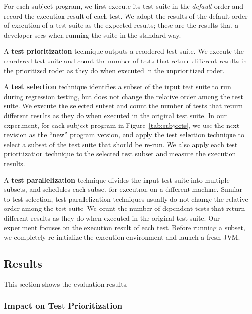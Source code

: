 For each subject program, we first execute its
test suite in the \textit{default} order and record
the execution result of each test.
We adopt the results of the default
order of execution of a test suite as the expected results; these
are the results that a developer sees when running the suite
in the standard way. 

A \textbf{test prioritization} technique outputs a reordered test suite.
We execute the reordered test suite and count the number
of tests that return different results
in the prioritized roder as they do when executed in the
unprioritized roder.

A \textbf{test selection} technique identifies a subset of the
input test suite to run during regression testing, but does not
change the relative order among the test suite. We execute
the selected subset and count the number of tests
that return different results as they do when executed
in the original test suite. In our experiment, for each
subject program in Figure~\ref{tab:subjects}, we use the next revision
as the ``new'' program version, and apply the test selection
technique to select a subset of the test suite that should
be re-run. We also apply each test prioritization technique
to the selected test subset and measure the execution results.

A \textbf{test parallelization} technique divides the input
test suite into multiple subsets, and schedules each
subset for execution on a different machine. Similar to
test selection, test parallelization techniques usually
do not change the relative order among the test suite.
We count the number of dependent tests that return different
results as they do when executed in the original test suite.
Our experiment focuses on the execution result of each test.
Before running a subset, we completely re-initialize the execution environment and launch
a fresh JVM.

\subsection{Results}
\label{sec:evalresults}

This section shows the evaluation results.

\subsubsection{Impact on Test Prioritization}

